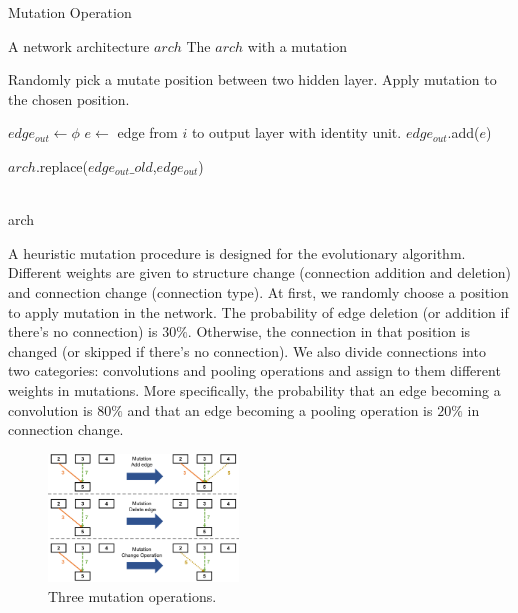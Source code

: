 \documentclass[conference]{IEEEtran}
\begin{document}
\begin{algorithm}[H]  
  \caption{ Mutation Operation}


  \begin{algorithmic}[1]  
  \Require A network architecture $arch$
  \Ensure The $arch$ with a mutation
  
  
      \State Randomly pick a mutate position between two hidden layer.
      \State Apply mutation to the chosen position. 
  \EndWhile
  
  \State $edge_{out} \gets \phi$
    \State $e \gets$ edge from $i$ to output layer with identity unit.
    \State $edge_{out}$.add($e$)
  \EndFor

  \State $arch$.replace($edge_{out}\_old$,$edge_{out}$)

  \\
  \Return arch
  \end{algorithmic}  
  \label{mutation}
\end{algorithm}  

A heuristic mutation procedure is designed for the evolutionary algorithm. Different weights are given to structure change (connection addition and deletion) and connection change (connection type). At first, we randomly choose a position to apply mutation in the network. The probability of edge deletion (or addition if there's no connection) is $30\%$. Otherwise, the connection in that position is changed (or skipped if there's no connection). We also divide connections into two categories: convolutions and pooling operations and assign to them different weights in mutations. More specifically, the probability that an edge becoming a convolution is $80\%$ and that an edge becoming a pooling operation is $20\%$ in connection change. 

\begin{figure}[H]
  \centering
  \includegraphics[width=0.45\textwidth]{figures/mutation.png}
  \caption{Three mutation operations.}\label{fig:digit}
  \label{mutation}
\end{figure}
\end{document}
